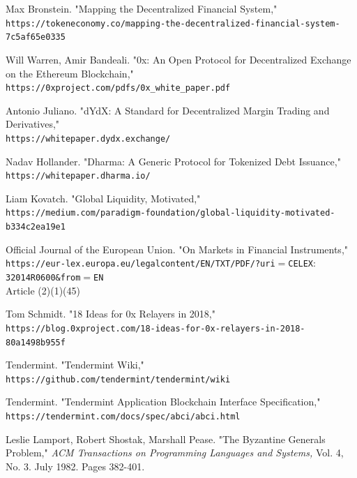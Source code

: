 \documentclass[9pt]{article}
\begin{document}
\begin{thebibliography}{9}

Max Bronstein. "Mapping the Decentralized Financial System,"
\\\texttt{https://tokeneconomy.co/mapping-the-decentralized-financial-system-7c5af65e0335}

Will Warren, Amir Bandeali. "0x: An Open Protocol for Decentralized Exchange on the Ethereum Blockchain,"
\\\texttt{https://0xproject.com/pdfs/0x\_white\_paper.pdf}

Antonio Juliano. "dYdX: A Standard for Decentralized Margin Trading and Derivatives,"
\\\texttt{https://whitepaper.dydx.exchange/}

Nadav Hollander. "Dharma: A Generic Protocol for Tokenized Debt Issuance,"
\\\texttt{https://whitepaper.dharma.io/}

Liam Kovatch. "Global Liquidity, Motivated,"
\\\texttt{https://medium.com/paradigm-foundation/global-liquidity-motivated-b334c2ea19e1}

Official Journal of the European Union. "On Markets in Financial Instruments,"
\\\texttt{https://eur-lex.europa.eu/legal\-content/EN/TXT/PDF/?uri$=$CELEX$:$32014R0600\&from$=$EN}
\\ Article (2)(1)(45)

Tom Schmidt. "18 Ideas for 0x Relayers in 2018,"
\\\texttt{https://blog.0xproject.com/18-ideas-for-0x-relayers-in-2018-80a1498b955f}

Tendermint. "Tendermint Wiki,"
\\\texttt{https://github.com/tendermint/tendermint/wiki}

Tendermint. "Tendermint Application Blockchain Interface Specification,"
\\\texttt{https://tendermint.com/docs/spec/abci/abci.html}

Leslie Lamport, Robert Shostak, Marshall Pease. "The Byzantine Generals Problem,"
\textit{ACM Transactions on Programming Languages and Systems, }Vol. 4, No. 3. July 1982. Pages 382-401.


\end{thebibliography}
\end{document}
